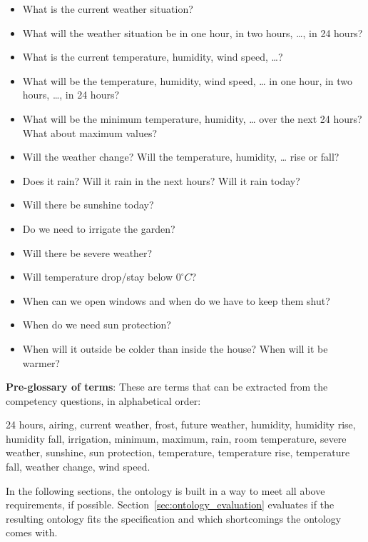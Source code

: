 \begin{mdframed}[linewidth=.6pt]
\begin{itemize}
  \item What is the current weather situation?
  \item What will the weather situation be in one hour, in two hours, …, in 24 hours?
  \item What is the current temperature, humidity, wind speed, …?
  \item What will be the temperature, humidity, wind speed, … in one hour, in two hours, …, in 24 hours?
  \item What will be the minimum temperature, humidity, … over the next 24 hours? What about maximum values?
  \item Will the weather change? Will the temperature, humidity, … rise or fall?
  \item Does it rain? Will it rain in the next hours? Will it rain today?
  \item Will there be sunshine today? 
  \item Do we need to irrigate the garden?
  \item Will there be severe weather?
  \item Will temperature drop/stay below $0^\circ C$?
  \item When can we open windows and when do we have to keep them shut?
  \item When do we need sun protection?
  \item When will it outside be colder than inside the house? When will it be warmer?
\end{itemize}

\setlength{\leftskip}{0cm}

\vspace{.2cm}

\textbf{Pre-glossary of terms}: These are terms that can be extracted from the competency questions, in alphabetical order:

24 hours, airing, current weather, frost, future weather, humidity, humidity rise, humidity fall, irrigation, minimum, maximum, rain, room temperature, severe weather, sunshine, sun protection, temperature, temperature rise, temperature fall, weather change, wind speed.

\setlength{\leftskip}{0cm}

\end{mdframed}

\vspace{.5cm}

In the following sections, the \smarthomeweather ontology is built in a way to meet all above requirements, if possible. Section~\ref{sec:ontology_evaluation} evaluates if the resulting ontology fits the specification and which shortcomings the ontology comes with.

